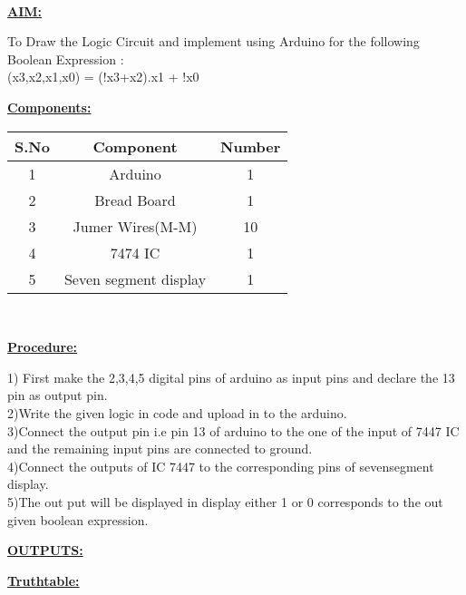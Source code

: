 \documentclass[10pt,a4paper]{report}
\begin{document}
\\ \raggedright \textbf{\underline{AIM:}}\vspace{2mm}
\\ \raggedright To Draw the Logic Circuit and implement using Arduino for the following Boolean Expression :
\\ (x3,x2,x1,x0) = (!x3+x2).x1 + !x0
\vspace{5mm}
\\ \raggedright \textbf{\underline{Components:}}\vspace{2mm}
\begin{table}[ht]
\centering %
\begin{tabular}{c c c} %
\hline\hline %
S.No & Component & Number \\ [0.5ex] %
\hline
1 & Arduino & 1 \\
2 & Bread Board & 1 \\
3 & Jumer Wires(M-M) & 10 \\
4 & 7474 IC & 1 \\
5 & Seven segment display & 1 \\ [1ex] 
\hline
\end{tabular}
\end{table}
\vspace{5mm}
\\ \raggedright \textbf{\underline{Procedure:}}\vspace{2mm}
\\ \raggedright 1) First make the 2,3,4,5 digital pins of arduino as input pins and declare the 13 pin as output pin.
\\ 2)Write the given logic in code and upload in to the arduino.
\\ 3)Connect the output pin i.e pin 13 of arduino to the one of the input of 7447 IC and the remaining input pins are connected to ground.
\\ 4)Connect the outputs of IC 7447 to the corresponding pins of sevensegment display.
\\ 5)The out put will be displayed in display either 1 or 0 corresponds to the out given boolean expression.
\vspace{5mm}
\\ \raggedright \textbf{\underline{OUTPUTS:}}\vspace{7mm}
\\ \raggedright \textbf{\underline{Truthtable:}}\vspace{2mm}
\end{document}
